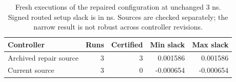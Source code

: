 \begin{table}[htbp]\centering\small\setlength{\tabcolsep}{4pt}
\caption{Fresh executions of the repaired configuration at unchanged 3 ns. Signed routed setup slack is in ns. Sources are checked separately; the narrow result is not robust across controller revisions.}\label{tab:timingrepeat}
\begin{tabular}{@{}lrrrr@{}}\toprule
Controller & Runs & Certified & Min slack & Max slack \\
\midrule
Archived repair source & 3 & 3 & 0.001586 & 0.001586 \\
Current source & 3 & 0 & -0.000654 & -0.000654 \\
\bottomrule\end{tabular}\end{table}
